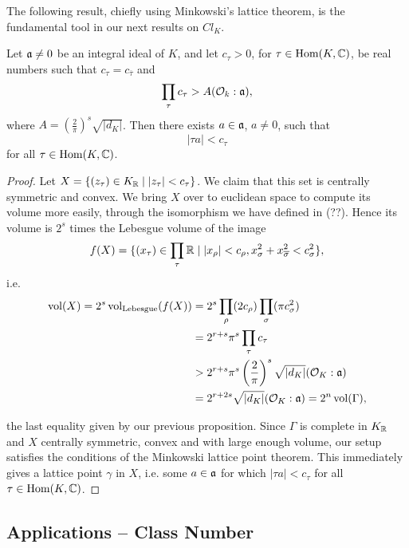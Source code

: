 The following result, chiefly using Minkowski's lattice theorem, is the fundamental tool in our next results on $Cl_K$.

\begin{theorem}
	Let $\mathfrak{a}\neq 0$ be an integral ideal of $K$, and let $c_\tau>0$, for $\tau\in\text{Hom}(K,\mathbb{C})$, be real numbers such that $c_\tau=c_{\overline{\tau}}$ and
	\[
		\prod_\tau c_\tau > A(\mathcal{O}_k:\mathfrak{a}),
	\]
	where $A=\left(\frac{2}{\pi}\right)^s\sqrt{|d_K|}$. Then there exists $a\in\mathfrak{a}$, $a\neq 0$, such that
	\[
		|\tau a| < c_\tau
	\]
	for all $\tau\in\text{Hom}(K,\mathbb{C})$.
\end{theorem}
\begin{proof}
	Let $X=\{(z_\tau)\in K_{\mathbb{R}} \mid |z_\tau| < c_\tau\}$. We claim that this set is centrally symmetric and convex. We bring $X$ over to euclidean space to compute its volume more easily, through the isomorphism we have defined in (??). Hence its volume is $2^s$ times the Lebesgue volume of the image
	\[
		f(X) = \{(x_\tau)\in\prod_\tau\mathbb{R} \mid |x_\rho| < c_\rho, x_{\sigma}^2+x_{\overline{\sigma}}^2 < c_{\sigma}^2\},
	\]
	i.e.
	\begin{align*}
		\operatorname{vol}(X) = 2^s \operatorname{vol}_{\text{Lebesgue}}(f(X)) &= 2^s\prod_\rho(2c_\rho)\prod_\sigma(\pi c_\sigma^2)\\
		&= 2^{r+s}\pi^s \prod_\tau c_\tau\\
		&> 2^{r+s}\pi^s \left(\frac{2}{\pi}\right)^s\sqrt{|d_K|}(\mathcal{O}_K:\mathfrak{a})\\
		&= 2^{r+2s}\sqrt{|d_K|}(\mathcal{O}_K:\mathfrak{a}) = 2^n\operatorname{vol}(\Gamma),
	\end{align*}

	the last equality given by our previous proposition. Since $\Gamma$ is complete in $K_{\mathbb{R}}$ and $X$ centrally symmetric, convex and with large enough volume, our setup satisfies the conditions of the Minkowski lattice point theorem. This immediately gives a lattice point $\gamma$ in $X$, i.e. some $a\in\mathfrak{a}$ for which $|\tau a|<c_\tau$ for all $\tau\in\text{Hom}(K,\mathbb{C})$.
\end{proof}



\subsection{Applications -- Class Number}

